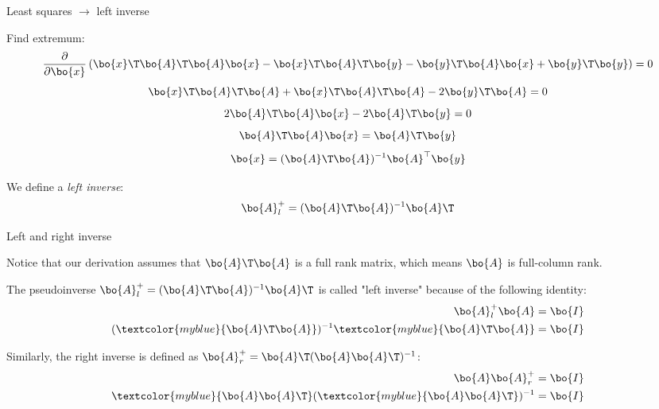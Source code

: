 \documentclass{beamer}
\begin{document}
\begin{frame}{Least squares $\rightarrow$ left inverse}
	\begin{flushleft}
		
		Find extremum:
		\begin{equation}
			\frac{\partial}{\partial \bo{x}}  \left( 
			\bo{x}\T\bo{A}\T\bo{A}\bo{x}
			-\bo{x}\T\bo{A}\T\bo{y} -\bo{y}\T\bo{A}\bo{x} +  \bo{y}\T \bo{y}
			\right) 
			= 0
		\end{equation}
		\begin{equation}
			 \bo{x}\T\bo{A}\T\bo{A} + \bo{x}\T\bo{A}\T\bo{A} - 2\bo{y}\T\bo{A} 
			= 0
		\end{equation}
		\begin{equation}
		2\bo{A}\T\bo{A}\bo{x} - 2\bo{A}\T\bo{y} 
		= 0
		\end{equation}
		\begin{equation}
			\bo{A}\T \bo{A}\bo{x} = \bo{A}\T\bo{y}
		\end{equation}
		\begin{equation}
			\bo{x} = (\bo{A}\T \bo{A})^{-1} \bo{A}^\top\bo{y}
		\end{equation}
		
		We define a \emph{left inverse}:
		\begin{equation}
			\bo{A}^+_l = (\bo{A}\T \bo{A})^{-1} \bo{A}\T
		\end{equation}
		
		
	\end{flushleft}
\end{frame}



\begin{frame}{Left and right inverse}
	\begin{flushleft}
		
		Notice that our derivation assumes that $\bo{A}\T \bo{A}$ is a full rank matrix, which means $\bo{A}$ is full-column rank.
		
		\bigskip
		
		The pseudoinverse $\bo{A}^+_l = (\bo{A}\T \bo{A})^{-1} \bo{A}\T$ is called "left inverse" because of the following identity:
		\begin{align}
			\bo{A}^+_l  \bo{A} =  \bo{I}
			\\
			(  \textcolor{myblue} {\bo{A}\T\bo{A}})^{-1} \textcolor{myblue} {\bo{A}\T\bo{A}} =  \bo{I}
		\end{align}
		
		\bigskip
		
		Similarly, the right inverse is defined as $\bo{A}^+_r = \bo{A}\T (\bo{A}\bo{A}\T )^{-1}$:
		\begin{align}
			\bo{A} \bo{A}^+_r=  \bo{I}
			\\
			 \textcolor{myblue}{\bo{A}\bo{A}\T} (\textcolor{myblue}{\bo{A}\bo{A}\T} )^{-1} =  \bo{I}
		\end{align}
		
	\end{flushleft}
\end{frame}
\end{document}
